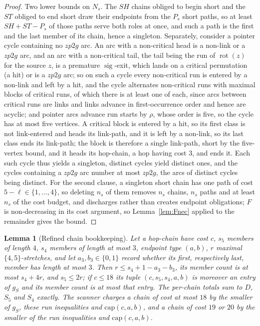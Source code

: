 \documentclass[10pt]{article}
\newtheorem{lemma}[theorem]{Lemma}
\theoremstyle{remark}
\theoremstyle{plain}
\newcommand{\rot}{\operatorname{rot}}
\newcommand{\sig}{\operatorname{sig}}
\begin{document}
\begin{proof}
Two lower bounds on $N_s$.  The
$\mathit{SH}$ chains obliged to begin short and the $\mathit{ST}$
obliged to end short draw their endpoints from the $P_s$ short paths,
so at least $\mathit{SH}+\mathit{ST}-P_s$ of those paths serve both
roles at once, and such a path is the first and the last member of its
chain, hence a singleton.  Separately, consider a pointer cycle
containing no $zp2g$ arc.  An arc with a non-critical head is a
non-link or a $zp2g$ arc, and an arc with a non-critical tail, the tail
being the run of $\rot(z)$ for the source $z$, is a premature
$\sig$-exit, which lands on a critical permutation (a hit) or is a
$zp2g$ arc; so on such a cycle every non-critical run is entered by a
non-link and left by a hit, and the cycle alternates non-critical runs
with maximal blocks of critical runs, of which there is at least one
of each, since arcs between critical runs are links and links advance
in first-occurrence order and hence are acyclic; and pointer arcs
advance run starts by $\rho$, whose order is five, so the cycle has at
most five vertices.  A critical block is entered by a hit, so its
first class is not link-entered and heads its link-path, and it is
left by a non-link, so its last class ends its link-path; the block is
therefore a single link-path, short by the five-vertex bound, and it
heads its hop-chain, a hop having cost $3$, and ends it.  Each such cycle thus yields a singleton, distinct cycles yield
distinct ones, and the cycles containing a $zp2g$ arc number at most
$zp2g$, the arcs of distinct cycles being distinct.  For the second clause, a singleton short chain has one
path of cost $5-\ell\in\{1,\dots,4\}$, so deleting $n_s$ of them
removes $n_s$ chains, $n_s$ paths and at least $n_s$ of the cost
budget, and discharges rather than creates endpoint obligations; $F$ is
non-decreasing in its cost argument, so Lemma~\ref{lem:Fnec} applied to
the remainder gives the bound.
\end{proof}

\begin{lemma}[Refined chain bookkeeping]\label{lem:refined}
Let a hop-chain have cost $c$, $s_5$ members of length $4$, $s_4$
members of length at most $3$, endpoint type $(a,b)$, $r$ maximal
$\{4,5\}$-stretches, and let $a_3,b_3\in\{0,1\}$ record whether its
first, respectively last, member has length at most $3$.  Then
$r\le s_4+1-a_3-b_3$, its member count is at most $s_4+4r$, and
$s_5\le 2r$; if $c\le 18$ its tuple $(c,s_5,s_4,a,b)$ is moreover an
entry of $g_S$ and its member count is at most that entry.  The
per-chain totals sum to $D$, $S_5$ and $S_4$ exactly.  The scanner
charges a chain of cost at most $18$ by the smaller of $g_S$, these
run inequalities and $\mathrm{cap}(c,a,b)$, and a chain of cost $19$ or
$20$ by the smaller of the run inequalities and $\mathrm{cap}(c,a,b)$.
\end{lemma}
\end{document}
